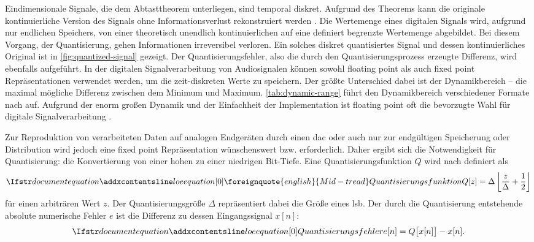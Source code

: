 Eindimensionale Signale, die dem \citeauthor{shannon} Abtasttheorem unterliegen, sind temporal diskret.
Aufgrund des Theorems kann die originale kontinuierliche Version des Signals ohne Informationsverlust rekonstruiert werden \autocite{shannon}.
Die Wertemenge eines digitalen Signals wird, aufgrund nur endlichen Speichers, von einer theoretisch unendlich kontinuierlichen auf eine definiert begrenzte Wertemenge abgebildet.
Bei diesem Vorgang, der Quantisierung, gehen Informationen irreversibel verloren.
Ein solches diskret quantisiertes Signal und dessen kontinuierliches Original ist in \autoref{fig:quantized-signal} gezeigt.
Der Quantisierungsfehler, also die durch den Quantisierungsprozess erzeugte Differenz, wird ebenfalls aufgeführt.
In der digitalen Signalverarbeitung von Audiosignalen können sowohl \gls{floating point} als auch \gls{fixed point} Repräsentationen verwendet werden, um die zeit-diskreten Werte zu speichern.
Der größte Unterschied dabei ist der Dynamikbereich -- die maximal mögliche Differenz zwischen dem Minimum und Maximum.
\autoref{tab:dynamic-range} führt den Dynamikbereich verschiedener Formate nach \citeauthor{dsp-guide} auf.
Aufgrund der enorm großen Dynamik und der Einfachheit der Implementation ist \gls{floating point} oft die bevorzugte Wahl für digitale Signalverarbeitung \autocite[S. 68ff]{dsp-guide}.

Zur Reproduktion von verarbeiteten Daten auf analogen Endgeräten durch einen \gls{dac} oder auch nur zur endgültigen Speicherung oder Distribution wird jedoch eine \gls{fixed point} Repräsentation wünschenswert bzw. erforderlich.
Daher ergibt sich die Notwendigkeit für Quantisierung: die Konvertierung von einer hohen zu einer niedrigen Bit-Tiefe.
Eine Quantisierungsfunktion $Q$ wird nach \citeauthor{dither} definiert als
\begin{equation}
    \setequationentry{\foreignquote{english}{Mid-tread} Quantisierungsfunktion}
    Q[z] = \Delta \left\lfloor \frac{z}{\Delta} + \frac{1}{2} \right\rfloor
\end{equation}
für einen arbiträren Wert $z$.
Der Quantisierungsgröße $\Delta$ repräsentiert dabei die Größe eines \gls{lsb}.
Der durch die Quantisierung entstehende absolute numerische Fehler $e$ ist die Differenz zu dessen Eingangssignal $x[n]$:
\begin{equation}
\setequationentry{Quantisierungsfehler}
e[n] = Q\bigl[x[n]\bigr] - x[n].
\end{equation}

